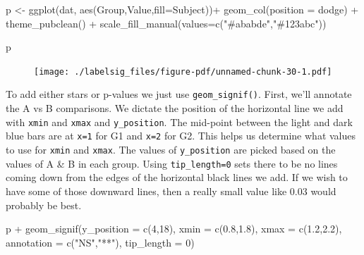 \documentclass[
  letterpaper,
  DIV=11,
  numbers=noendperiod]{scrreprt}
\newenvironment{Shaded}{\begin{snugshade}}{\end{snugshade}}
\newcommand{\AttributeTok}[1]{\textcolor[rgb]{0.40,0.45,0.13}{#1}}
\newcommand{\DecValTok}[1]{\textcolor[rgb]{0.68,0.00,0.00}{#1}}
\newcommand{\FloatTok}[1]{\textcolor[rgb]{0.68,0.00,0.00}{#1}}
\newcommand{\FunctionTok}[1]{\textcolor[rgb]{0.28,0.35,0.67}{#1}}
\newcommand{\NormalTok}[1]{\textcolor[rgb]{0.00,0.23,0.31}{#1}}
\newcommand{\OtherTok}[1]{\textcolor[rgb]{0.00,0.23,0.31}{#1}}
\newcommand{\SpecialCharTok}[1]{\textcolor[rgb]{0.37,0.37,0.37}{#1}}
\newcommand{\StringTok}[1]{\textcolor[rgb]{0.13,0.47,0.30}{#1}}
\begin{document}
\begin{Shaded}
\begin{Highlighting}[]
\NormalTok{p }\OtherTok{\textless{}{-}} \FunctionTok{ggplot}\NormalTok{(dat, }\FunctionTok{aes}\NormalTok{(Group,Value,}\AttributeTok{fill=}\NormalTok{Subject))}\SpecialCharTok{+}
  \FunctionTok{geom\_col}\NormalTok{(}\AttributeTok{position =} \StringTok{\textquotesingle{}dodge\textquotesingle{}}\NormalTok{) }\SpecialCharTok{+}
  \FunctionTok{theme\_pubclean}\NormalTok{() }\SpecialCharTok{+}
  \FunctionTok{scale\_fill\_manual}\NormalTok{(}\AttributeTok{values=}\FunctionTok{c}\NormalTok{(}\StringTok{"\#ababde"}\NormalTok{,}\StringTok{"\#123abc"}\NormalTok{))}

\NormalTok{p}
\end{Highlighting}
\end{Shaded}

\begin{figure}[H]

{\centering \texttt{[image: ./labelsig\_files/figure-pdf/unnamed-chunk-30-1.pdf]}

}

\end{figure}

To add either stars or p-values we just use \texttt{geom\_signif()}.
First, we'll annotate the A vs B comparisons. We dictate the position of
the horizontal line we add with \texttt{xmin} and \texttt{xmax} and
\texttt{y\_position}. The mid-point between the light and dark blue bars
are at \texttt{x=1} for G1 and \texttt{x=2} for G2. This helps us
determine what values to use for \texttt{xmin} and \texttt{xmax}. The
values of \texttt{y\_position} are picked based on the values of A \& B
in each group. Using \texttt{tip\_length=0} sets there to be no lines
coming down from the edges of the horizontal black lines we add. If we
wish to have some of those downward lines, then a really small value
like 0.03 would probably be best.

\begin{Shaded}
\begin{Highlighting}[]
\NormalTok{p }\SpecialCharTok{+} 
  \FunctionTok{geom\_signif}\NormalTok{(}\AttributeTok{y\_position =} \FunctionTok{c}\NormalTok{(}\DecValTok{4}\NormalTok{,}\DecValTok{18}\NormalTok{), }
              \AttributeTok{xmin =} \FunctionTok{c}\NormalTok{(}\FloatTok{0.8}\NormalTok{,}\FloatTok{1.8}\NormalTok{), }
              \AttributeTok{xmax =} \FunctionTok{c}\NormalTok{(}\FloatTok{1.2}\NormalTok{,}\FloatTok{2.2}\NormalTok{), }
              \AttributeTok{annotation =} \FunctionTok{c}\NormalTok{(}\StringTok{"NS"}\NormalTok{,}\StringTok{"**"}\NormalTok{),}
              \AttributeTok{tip\_length =} \DecValTok{0}\NormalTok{)}
\end{Highlighting}
\end{Shaded}
\end{document}
